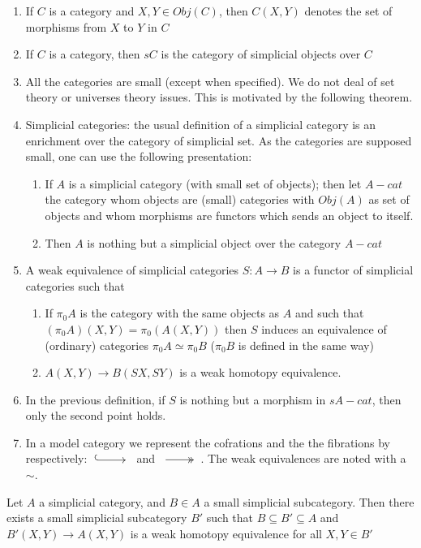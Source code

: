 \begin{enumerate}
\item If $C$ is a category and $X,Y \in Obj(C)$, then $C(X,Y)$ denotes the set of morphisms from $X$ to $Y$ in $C$
\item If $C$ is a category, then $sC$ is the category of simplicial objects over $C$ 
\item All the categories are small (except when specified). We do not deal of set theory or universes theory issues. This is motivated by the following theorem.
\item Simplicial categories: the usual definition of a simplicial category is an enrichment over the category of simplicial set. As the categories are supposed small, one can use the following presentation:
\begin{enumerate}
\item If $A$ is a simplicial category (with small set of objects); then let $A-cat$ the category whom objects are (small) categories with $Obj(A)$ as set of objects and whom morphisms are functors which sends an object to itself.
\item Then $A$ is nothing but a simplicial object over the category $A-cat$
\end{enumerate}
\item A weak equivalence of simplicial categories $S :A \rightarrow B$ is a functor of simplicial categories such that
\begin{enumerate}
\item If $\pi_0 A$ is the category with the same objects as $A$ and such that $(\pi_0 A) (X,Y)= \pi_0 (A(X,Y))$ then $S$ induces an equivalence of (ordinary) categories $\pi_0 A \simeq \pi_0 B$ ($\pi_0 B$ is defined in the same way)
\item $A(X,Y) \rightarrow B(SX,SY)$ is a weak homotopy equivalence.
\end{enumerate}
\item In the previous definition, if $S$ is nothing but a morphism in $sA-cat$, then only the second point holds.
\item In a model category we represent the cofrations and the the fibrations by respectively: $\xymatrix{{} \ar@{^{(}->}[r] & {}}$ and $\xymatrix{{} \ar@{->>}[r] & {}}$. The weak equivalences are noted with a $\sim$.
\end{enumerate}

\begin{thm}
Let $A$ a simplicial category, and $B \in A$ a small simplicial subcategory. Then there exists a small simplicial subcategory $B'$ such that $B \subseteq B' \subseteq A$ and $B'(X,Y) \rightarrow A(X,Y)$ is a weak homotopy equivalence for all $X,Y \in B'$
\end{thm}

